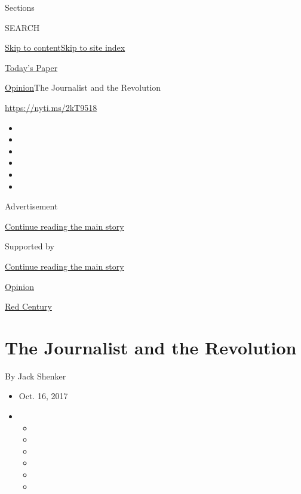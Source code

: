 Sections

SEARCH

\protect\hyperlink{site-content}{Skip to
content}\protect\hyperlink{site-index}{Skip to site index}

\href{https://myaccount.nytimes3xbfgragh.onion/auth/login?response_type=cookie\&client_id=vi}{}

\href{https://www.nytimes3xbfgragh.onion/section/todayspaper}{Today's
Paper}

\href{/section/opinion}{Opinion}\textbar{}The Journalist and the
Revolution

\url{https://nyti.ms/2kT9518}

\begin{itemize}
\item
\item
\item
\item
\item
\item
\end{itemize}

Advertisement

\protect\hyperlink{after-top}{Continue reading the main story}

Supported by

\protect\hyperlink{after-sponsor}{Continue reading the main story}

\href{/section/opinion}{Opinion}

\href{/column/red-century}{Red Century}

\hypertarget{the-journalist-and-the-revolution}{%
\section{The Journalist and the
Revolution}\label{the-journalist-and-the-revolution}}

By Jack Shenker

\begin{itemize}
\item
  Oct. 16, 2017
\item
  \begin{itemize}
  \item
  \item
  \item
  \item
  \item
  \item
  \end{itemize}
\end{itemize}

